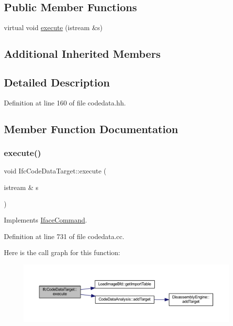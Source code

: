 \subsection*{Public Member Functions}
\begin{DoxyCompactItemize}
\item 
virtual void \mbox{\hyperlink{class_ifc_code_data_target_a13114442d43a73d46354db913edc5cdc}{execute}} (istream \&s)
\end{DoxyCompactItemize}
\subsection*{Additional Inherited Members}


\subsection{Detailed Description}


Definition at line 160 of file codedata.\+hh.



\subsection{Member Function Documentation}
\mbox{\label{class_ifc_code_data_target_a13114442d43a73d46354db913edc5cdc}} 
\subsubsection{\texorpdfstring{execute()}{execute()}}
{\footnotesize\ttfamily void Ifc\+Code\+Data\+Target\+::execute (\begin{DoxyParamCaption}\item[{istream \&}]{s }\end{DoxyParamCaption})\hspace{0.3cm}{\ttfamily [virtual]}}



Implements \mbox{\hyperlink{class_iface_command_af10e29cee2c8e419de6efe9e680ad201}{Iface\+Command}}.



Definition at line 731 of file codedata.\+cc.

Here is the call graph for this function\+:
\nopagebreak
\begin{figure}[H]
\begin{center}
\leavevmode
\includegraphics[width=350pt]{class_ifc_code_data_target_a13114442d43a73d46354db913edc5cdc_cgraph}
\end{center}
\end{figure}


